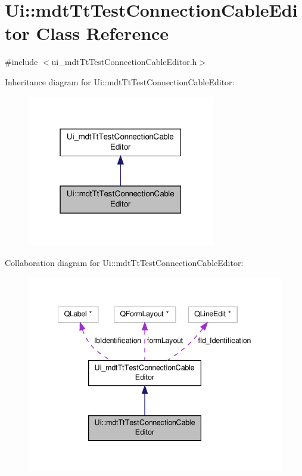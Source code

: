 \hypertarget{class_ui_1_1mdt_tt_test_connection_cable_editor}{\section{Ui\-:\-:mdt\-Tt\-Test\-Connection\-Cable\-Editor Class Reference}
\label{class_ui_1_1mdt_tt_test_connection_cable_editor}
}


{\ttfamily \#include $<$ui\-\_\-mdt\-Tt\-Test\-Connection\-Cable\-Editor.\-h$>$}



Inheritance diagram for Ui\-:\-:mdt\-Tt\-Test\-Connection\-Cable\-Editor\-:\nopagebreak
\begin{figure}[H]
\begin{center}
\leavevmode
\includegraphics[width=232pt]{class_ui_1_1mdt_tt_test_connection_cable_editor__inherit__graph}
\end{center}
\end{figure}


Collaboration diagram for Ui\-:\-:mdt\-Tt\-Test\-Connection\-Cable\-Editor\-:\nopagebreak
\begin{figure}[H]
\begin{center}
\leavevmode
\includegraphics[width=341pt]{class_ui_1_1mdt_tt_test_connection_cable_editor__coll__graph}
\end{center}
\end{figure}
